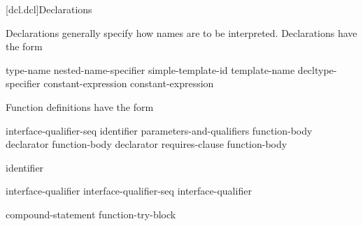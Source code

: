 [dcl.dcl]{Declarations}%



\pnum
Declarations generally specify how names are to be interpreted. Declarations have
the form

\begin{bnf}
\br
     type-name\br
    nested-name-specifier  simple-template-id\br
     template-name\br
    \br
    \br
    \br
    \br
    \br
    \br
    \br
    \br
    \br
    \br
    \br
    \br
    \br
    \br
    decltype-specifier\br
     \terminal{(} constant-expression \terminal{)} \atomicc \br
     \terminal{(} constant-expression \terminal{)} \atomicc
\end{bnf}

\pnum
{}%
Function definitions have the form

%
%
\begin{bnf}
\br
     interface-qualifier-seq identifier parameters-and-qualifiers function-body \atomicc\br
      declarator  function-body\br
      declarator requires-clause function-body
\end{bnf}

\begin{bnf}
 \atomicc\br
    identifier  \atomicc

 \atomicc\br
    interface-qualifier \atomicc\br
    interface-qualifier-seq interface-qualifier \atomicc
\end{bnf}

\begin{bnf}
\br
      compound-statement \atomicc\br
    function-try-block\br
    \br
\end{bnf}

